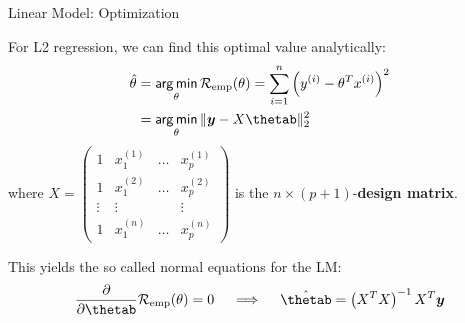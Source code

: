 \documentclass[11pt,compress,t,notes=noshow, xcolor=table]{beamer}
\newenvironment{knitrout}{}{} %
\begin{document}
\begin{vbframe}{Linear Model: Optimization}
\begin{knitrout}
{}



\end{knitrout}


\framebreak

For L2 regression, we can find this optimal value analytically:
\begin{align*}
\hat{\theta} &= \argmin_{\theta} \risket = \sumin \left(\yi - \theta^T \xi\right)^2\\
             &=\argmin_{\theta} \|\yv - X\thetab\|^2_2\
\end{align*}
where $X = \left(\begin{smallmatrix}1 & x^{(1)}_1 & \ldots & x^{(1)}_p \\
                              1 & x^{(2)}_1 & \ldots & x^{(2)}_p \\
                              \vdots & \vdots & & \vdots \\
                              1 & x^{(n)}_1 & \ldots & x^{(n)}_p \end{smallmatrix}\right)$
is the $n \times (p+1)$-\textbf{design matrix}.

\lz

This yields the so called normal equations for the LM:
\[
\frac{\partial}{\partial\thetab} \risket = 0 \quad\implies\quad \hat{\thetab} = \left(X^T X\right)^{-1}X^T\yv
\]

\end{vbframe}
\end{document}
